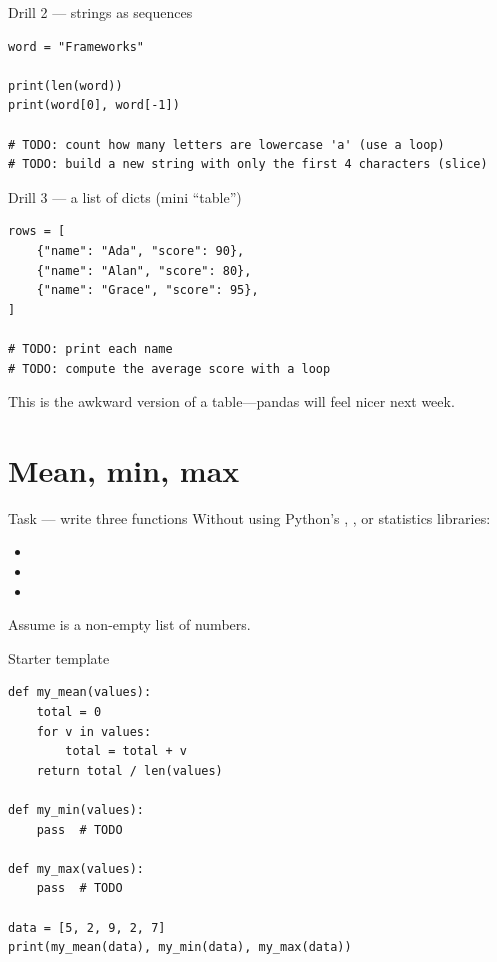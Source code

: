 \documentclass[aspectratio=169,11pt]{beamer}
\begin{document}
    \begin{frame}[fragile]{Drill 2 --- strings as sequences}
        \begin{lstlisting}
word = "Frameworks"

print(len(word))
print(word[0], word[-1])

# TODO: count how many letters are lowercase 'a' (use a loop)
# TODO: build a new string with only the first 4 characters (slice)
        \end{lstlisting}
    \end{frame}

    \begin{frame}[fragile]{Drill 3 --- a list of dicts (mini ``table'')}
        \begin{lstlisting}
rows = [
    {"name": "Ada", "score": 90},
    {"name": "Alan", "score": 80},
    {"name": "Grace", "score": 95},
]

# TODO: print each name
# TODO: compute the average score with a loop
        \end{lstlisting}
        \vspace{0.3em}
        This is the awkward version of a table---pandas will feel nicer next week.
    \end{frame}

    \section{Mean, min, max}

    \begin{frame}{Task --- write three functions}
        Without using Python's , , or statistics libraries:
        \begin{itemize}
            \item {}
            \item {}
            \item {}
        \end{itemize}
        \vspace{0.5em}
        Assume  is a non-empty list of numbers.
    \end{frame}

    \begin{frame}[fragile]{Starter template}
        \begin{lstlisting}
def my_mean(values):
    total = 0
    for v in values:
        total = total + v
    return total / len(values)

def my_min(values):
    pass  # TODO

def my_max(values):
    pass  # TODO

data = [5, 2, 9, 2, 7]
print(my_mean(data), my_min(data), my_max(data))
        \end{lstlisting}
    \end{frame}
\end{document}
